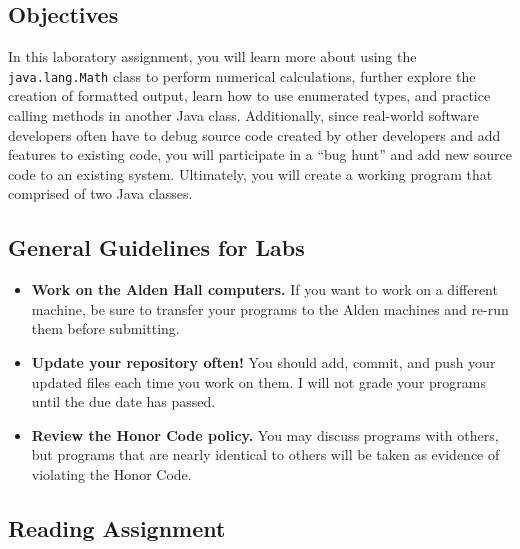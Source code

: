 



\subsection*{Objectives}

In this laboratory assignment, you will learn more about using the {\tt java.lang.Math} class to perform numerical
calculations, further explore the creation of formatted output, learn how to use enumerated types, and practice calling
methods in another Java class.  Additionally, since real-world software developers often have to debug source code
created by other developers and add features to existing code, you will participate in a ``bug hunt'' and add new
source code to an existing system. Ultimately, you will create a working program that comprised of two Java classes.

\vspace*{-.1in}
\subsection*{General Guidelines for Labs}

\begin{itemize}
\item
{\bf Work on the Alden Hall computers.} If you want to work on a different
machine, be sure to transfer your programs to the Alden
machines and re-run them before submitting.
\item
{\bf Update your repository often!} You should add, commit, 
and push your updated files each time you work on them.  I will not grade 
your programs until the due date has passed.
\item
{\bf Review the Honor Code policy.} You
may discuss programs with others, but programs that are nearly identical
to others will be taken as evidence of violating the Honor Code.
\end{itemize}

\vspace*{-.2in}
\subsection*{Reading Assignment}

